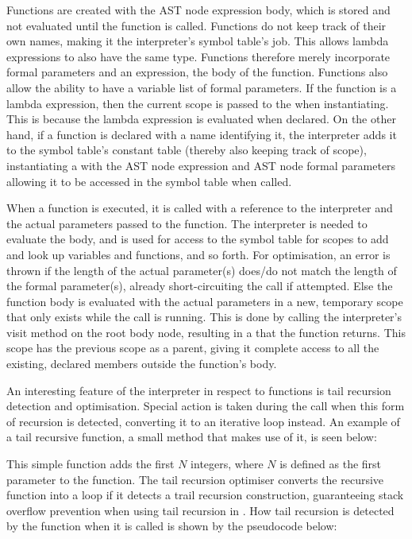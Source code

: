 Functions are created with the AST node expression body, which is
stored and not evaluated until the function is called. Functions
do not keep track of their own names, making it the interpreter's
symbol table's job. This allows lambda expressions to also have the
same type. Functions therefore merely incorporate formal parameters
and an expression, the body of the function. Functions also allow
the ability to have a variable list of formal parameters. If the
function is a lambda expression, then the current scope is passed to
the  when instantiating. This is because the lambda
expression is evaluated when declared. On the other hand, if a function
is declared with a name identifying it, the interpreter adds it to the
symbol table's constant table (thereby also keeping track of scope),
instantiating a  with the AST node expression and AST
node formal parameters allowing it to be accessed in the symbol table
when called.

When a function is executed, it is called with a reference to the
interpreter and the actual parameters passed to the function. The
interpreter is needed to evaluate the body, and is used for access to
the symbol table for scopes to add and look up variables and functions,
and so forth. For optimisation, an error is thrown if the length of
the actual parameter(s) does/do not match the length of the formal
parameter(s), already short-circuiting the call if attempted. Else
the function body is evaluated with the actual parameters in a new,
temporary scope that only exists while the call is running. This is
done by calling the interpreter's visit method on the root body node,
resulting in a  that the function returns. This scope
has the previous scope as a parent, giving it complete access to all the
existing, declared members outside the function's body.

An interesting feature of the interpreter in respect to functions is
tail recursion detection and optimisation. Special action is taken
during the call when this form of recursion is detected, converting it
to an iterative loop instead. An example of a tail recursive function, a
small method  that makes use of it, is seen below:


This simple function adds the first $N$ integers, where $N$ is defined as the first parameter to the function. The tail recursion optimiser converts the recursive function into a loop if it detects a trail recursion construction, guaranteeing stack overflow prevention when using tail recursion in \productname. How tail recursion is detected by the function when it is called is shown by the pseudocode below:

